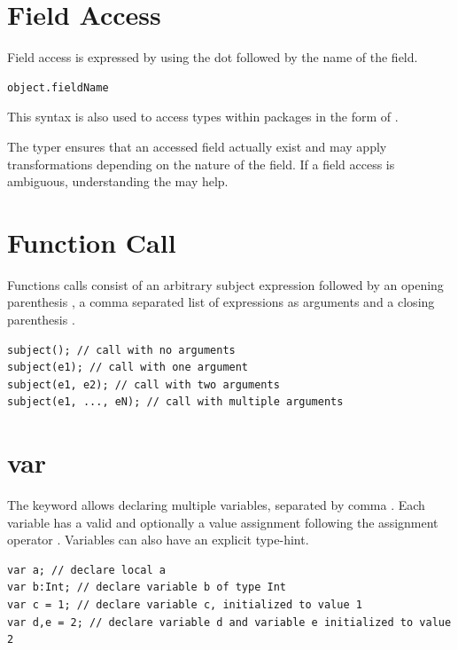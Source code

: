 \documentclass{haxe}
\begin{document}
\section{Field Access}
\label{expression-field-access}

Field access is expressed by using the dot  followed by the name of the field.

\begin{lstlisting}
object.fieldName
\end{lstlisting}

This syntax is also used to access types within packages in the form of . 

The typer ensures that an accessed field actually exist and may apply transformations depending on the nature of the field. If a field access is ambiguous, understanding the  may help.


\section{Function Call}
\label{expression-function-call}

Functions calls consist of an arbitrary subject expression followed by an opening parenthesis \expr{(}, a comma \expr{,} separated list of expressions as arguments and a closing parenthesis \expr{)}.

\begin{lstlisting}
subject(); // call with no arguments
subject(e1); // call with one argument
subject(e1, e2); // call with two arguments
subject(e1, ..., eN); // call with multiple arguments
\end{lstlisting}


\section{var}
\label{expression-var}

The  keyword allows declaring multiple variables, separated by comma \expr{,}. Each variable has a valid  and optionally a value assignment following the assignment operator \expr{=}. Variables can also have an explicit type-hint.

\begin{lstlisting}
var a; // declare local a
var b:Int; // declare variable b of type Int
var c = 1; // declare variable c, initialized to value 1
var d,e = 2; // declare variable d and variable e initialized to value 2
\end{lstlisting}
\end{document}
